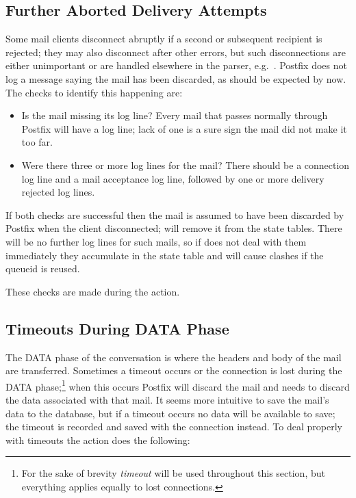 \subsection{Further Aborted Delivery Attempts}

Some mail clients disconnect abruptly if a second or subsequent recipient
is rejected; they may also disconnect after other errors, but such
disconnections are either unimportant or are handled elsewhere in the
parser, e.g.\ .  Postfix does not
log a message saying the mail has been discarded, as should be expected by
now.  The checks to identify this happening are:

\begin{itemize}

    \item Is the mail missing its  log line?  Every mail
        that passes normally through Postfix will have a 
        log line; lack of one is a sure sign the mail did not make it too
        far.

    \item Were there three or more  log lines for the mail?
        There should be a connection log line and a mail acceptance log
        line, followed by one or more delivery rejected log lines.

\end{itemize}

If both checks are successful then the mail is assumed to have been
discarded by Postfix when the client disconnected; \parsername{} will
remove it from the state tables.  There will be no further log lines for
such mails, so if \parsername{} does not deal with them immediately they
accumulate in the state table and will cause clashes if the queueid is
reused.

These checks are made during the  action.

\subsection{Timeouts During DATA Phase}

\label{timeouts during data phase}

The DATA phase of the  conversation is where the headers and
body of the mail are transferred.  Sometimes a timeout occurs or the
connection is lost during the DATA phase;\footnote{For the sake of brevity
\textit{timeout\/} will be used throughout this section, but everything
applies equally to lost connections.} when this occurs Postfix will discard
the mail and \parsername{} needs to discard the data associated with that
mail.  It seems more intuitive to save the mail's data to the database, but
if a timeout occurs no data will be available to save; the timeout is
recorded and saved with the connection instead.  To deal properly with
timeouts the  action does the following:

